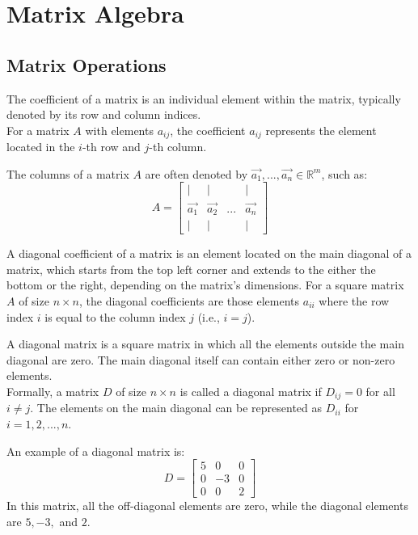\chapter{Matrix Algebra}

\section{Matrix Operations}
\begin{definition}[Coefficient]
    The coefficient of a matrix is an individual element within the matrix, typically denoted by its row and column indices. \\
    For a matrix \( A \) with elements \( a_{ij} \), the coefficient \( a_{ij} \) represents the element located in the \( i \)-th row and \( j \)-th column.
\end{definition}
The columns of a matrix $A$ are often denoted by $\vec{a_1}, ..., \vec{a_n} \in \mathbb{R}^m$, such as:
\[
    A = 
    \begin{bmatrix}
        | & | &        & | \\
        \vec{a_1} & \vec{a_2} & ... & \vec{a_n} \\
        | & | &        & |
    \end{bmatrix}
\]
\begin{definition}
    A diagonal coefficient of a matrix is an element located on the main diagonal of a matrix, which starts from the top left corner and extends to the either the bottom or the right, depending on the matrix's dimensions. For a square matrix \( A \) of size \( n \times n \), the diagonal coefficients are those elements \( a_{ii} \) where the row index \( i \) is equal to the column index \( j \) (i.e., \( i = j \)).
\end{definition}

\begin{definition}
    A diagonal matrix is a square matrix in which all the elements outside the main diagonal are zero. The main diagonal itself can contain either zero or non-zero elements. \\
    Formally, a matrix \( D \) of size \( n \times n \) is called a diagonal matrix if \( D_{ij} = 0 \) for all \( i \neq j \). The elements on the main diagonal can be represented as \( D_{ii} \) for \( i = 1, 2, ..., n \).
\end{definition}
\begin{eg}
    An example of a diagonal matrix is:
    \[
        D = 
        \begin{bmatrix}
            5 & 0 & 0 \\
            0 & -3 & 0 \\
            0 & 0 & 2
        \end{bmatrix}
    \]
    In this matrix, all the off-diagonal elements are zero, while the diagonal elements are \( 5, -3, \) and \( 2 \).
\end{eg}

